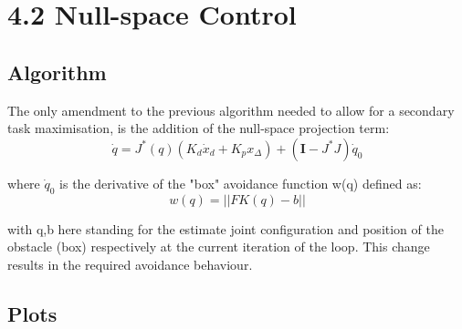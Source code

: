 \documentclass[11pt]{report}
\begin{document}
\begin{figure}[h]
  \centering

\end{figure}

\section*{4.2 Null-space Control}
\subsection*{Algorithm}
The only amendment to the previous algorithm needed to allow for a secondary task maximisation, is the addition of the null-space projection term:
\begin{equation*}
    \dot{q} = J^{\text{*}}(q) (K_{d} \dot{x}_{d} + K_{p}x_{\Delta} ) + (\mathbf{I} - J^{\text{*}}J )\dot{q}_{0}
\end{equation*}

\noindent where $\dot{q}_{0}$ is the derivative of the "box" avoidance function w(q) defined as:
\begin{equation*}
    w(q) = || FK(q) - b ||
\end{equation*}

\noindent with q,b here standing for the estimate joint configuration and position of the obstacle (box) respectively at the current iteration of the loop. This change results in the required avoidance behaviour.

\subsection*{Plots}
\end{document}
